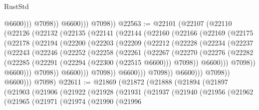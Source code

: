 \begin{lexlean}{RustStd}
\begin{coremodule}
                        @6600)))
                  @7098))
              @6600)))
        @7098))
@22563 := @22101
    (@22107
      (@22110
        (@22126
          (@22132
            (@22135
              (@22141
                (@22144
                  (@22160
                    (@22166
                      (@22169
                        (@22175
                          (@22178
                            (@22194
                              (@22200
                                (@22203
                                  (@22209
                                    (@22212
                                      (@22228
                                        (@22234
                                          (@22237
                                            (@22243
                                              (@22246
                                                (@22252
                                                  (@22258
                                                    (@22261
                                                      (@22267
                                                        (@22270
                                                          (@22276
                                                            (@22282
                                                              (@22285
                                                                (@22291
                                                                  (@22294 (@22300 (@22515 @6600)))
                                                                  @7098))
                                                              @6600)))
                                                        @7098))
                                                    @6600)))
                                              @7098))
                                          @6600)))
                                    @7098))
                                @6600)))
                          @7098))
                      @6600)))
                @7098))
            @6600)))
      @7098)
@22611 := @21869
    (@21872
      (@21888
        (@21894
          (@21897
            (@21903
              (@21906
                (@21922
                  (@21928
                    (@21931
                      (@21937
                        (@21940
                          (@21956
                            (@21962
                              (@21965
                                (@21971
                                  (@21974
                                    (@21990
                                      (@21996

\end{coremodule}
\end{lexlean}
